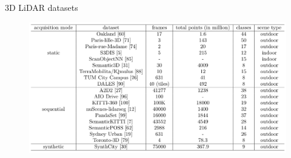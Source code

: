 \documentclass[aspectratio=169]{beamer}
\begin{document}
\begin{frame}{3D LiDAR datasets}
    \begin{figure}
        \centering
        \includegraphics[scale=0.23]{images/sota_datasets.png}
    \end{figure}
    \begin{table}
        \caption{3D LiDAR datasets classified based on the acquisition type. Table updated from \cite{survey3d}.}
    \end{table}
\end{frame}
\end{document}
